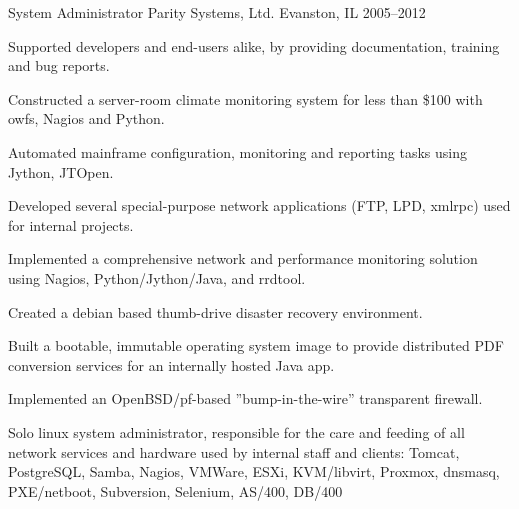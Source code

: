 \begin{cventries}
  \cventry
    {System Administrator} %
    {Parity Systems, Ltd.} %
    {Evanston, IL} %
    {2005--2012} %
    {
      \begin{cvitems} %
        \item {Supported developers and end-users alike, by providing documentation, training and bug reports.}
        \item {Constructed a server-room climate monitoring system for less than \$100 with owfs, Nagios and Python.}
        \item {Automated mainframe configuration, monitoring and reporting tasks using Jython, JTOpen.}
        \item {Developed several special-purpose network applications (FTP, LPD, xmlrpc) used for internal projects.}
        \item {Implemented a comprehensive network and performance monitoring solution using Nagios, Python/Jython/Java, and rrdtool.}
        \item {Created a debian based thumb-drive disaster recovery environment.}
        \item {Built a bootable, immutable operating system image to provide distributed PDF conversion services for an internally hosted Java app.}
        \item {Implemented an OpenBSD/pf-based ”bump-in-the-wire” transparent firewall.}
      \end{cvitems}
    }
    {
      \begin{cventrysummary}
        Solo linux system administrator, responsible for the care and feeding of all network services and hardware used by internal staff and clients:
        Tomcat, PostgreSQL, Samba, Nagios, VMWare, ESXi, KVM/libvirt, Proxmox, dnsmasq, PXE/netboot, Subversion, Selenium, AS/400, DB/400
      \end{cventrysummary}
    }


\end{cventries}
